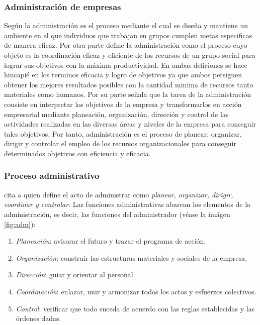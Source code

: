 \subsubsection{Administraci\'on de empresas}
Seg\'un \cite{koontz} la administraci\'on es el proceso mediante el cual se dise\~na
y mantiene un ambiente en el que individuos que trabajan en grupos cumplen metas
especificas de manera eficaz. Por otra parte \citep{galindo} define la administraci\'on
como el proceso cuyo objeto es la coordinaci\'on eficaz y eficiente de los recursos
de un grupo social para lograr sus objetivos con la m\'axima productividad.
En ambas deficiones se hace hincapi\'e en los terminos eficacia y logro de objetivos
ya que ambos persiguen obtener los mejores resultados posibles con la cantidad
minima de recursos tanto materiales como humanos. Por su parte \citep{chiavenato}
se\~nala que la tarea de la administraci\'on consiste en interpretar los objetivos
de la empresa y transformarlos en acci\'on empresarial mediante planeaci\'on, organizaci\'on,
direcci\'on y control de las actividades realizadas en las diversas \'areas y niveles
de la empresa para conseguir tales objetivos. Por tanto, administraci\'on es el
proceso de planear, organizar, dirigir y controlar el empleo de los recursos
organizacionales para conseguir determinados objetivos con eficiencia y eficacia.

\subsubsection{Proceso administrativo}
\cite{chiavenato} cita a \citep{fayol} quien define el acto de administrar como
\emph{planear, organizar, dirigir, coordinar y controlar}. Las funciones administrativas
abarcan los elementos de la administraci\'on, es decir, las funciones del administrador
(v\'ease la im\'agen \ref{fig:adm}):
\begin{enumerate}
    \item \emph{Planeaci\'on}: avisorar el futuro y trazar el programa de acci\'on.
    \item \emph{Organizaci\'on}: construir las estructuras materiales y sociales de
          la empresa.
    \item \emph{Direcci\'on}: guiar y orientar al personal.
    \item \emph{Coordinaci\'on}: enlazar, unir y armonizar todos los actos y esfuerzos
          colectivos.
    \item \emph{Control}: verificar que todo suceda de acuerdo con las reglas establecidas
          y las \'ordenes dadas.
\end{enumerate}

